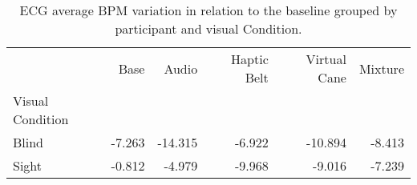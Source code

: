 
\begin{table}[!htb]
\centering
\caption{ECG average BPM variation in relation to the baseline grouped by participant and visual Condition.}
\label{tab:ecg_bpm_variation_group}
\begin{tabular}{lrrrrr}
\toprule
{} &   Base &   Audio &  Haptic Belt &  Virtual Cane &  Mixture \\
Visual Condition &        &         &              &               &          \\
\midrule
Blind            & -7.263 & -14.315 &       -6.922 &       -10.894 &   -8.413 \\
Sight            & -0.812 &  -4.979 &       -9.968 &        -9.016 &   -7.239 \\
\bottomrule
\end{tabular}
\end{table}

